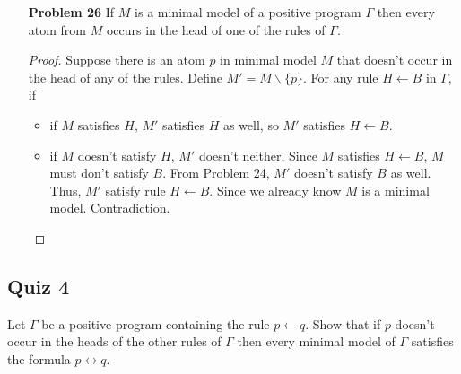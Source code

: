 \begin{enumerate}
\item[\textbf{Problem 26}] If $M$ is a minimal model of a positive program $\Gamma$ then every atom from $M$ occurs in the head of one of the rules of $\Gamma$. 


\begin{proof} Suppose there is an atom $p$ in minimal model $M$ that doesn't occur in the head of any of the rules. Define $M' = M \backslash \{p\}$. For any rule $H \leftarrow B$ in $\Gamma$, if 
    \begin{itemize}
        \item if $M$ satisfies $H$, $M'$ satisfies $H$ as well, so $M'$ satisfies $H \leftarrow B$. 
        \item if $M$ doesn't satisfy $H$, $M'$ doesn't neither. Since $M$ satisfies $H \leftarrow B$, $M$ must don't satisfy $B$. From Problem 24, $M'$ doesn't satisfy $B$ as well.  Thus, $M'$ satisfy rule $H \leftarrow B$. Since we already know $M$ is a minimal model. Contradiction. 
    \end{itemize}
\end{proof}
\end{enumerate}

\subsection{Quiz 4}
\noindent
Let $\Gamma$ be a positive program containing the rule $p \leftarrow q$. Show that if $p$ doesn't occur in the heads of the other rules of $\Gamma$ then every minimal model of $\Gamma$ satisfies the formula $p \leftrightarrow q$. 

